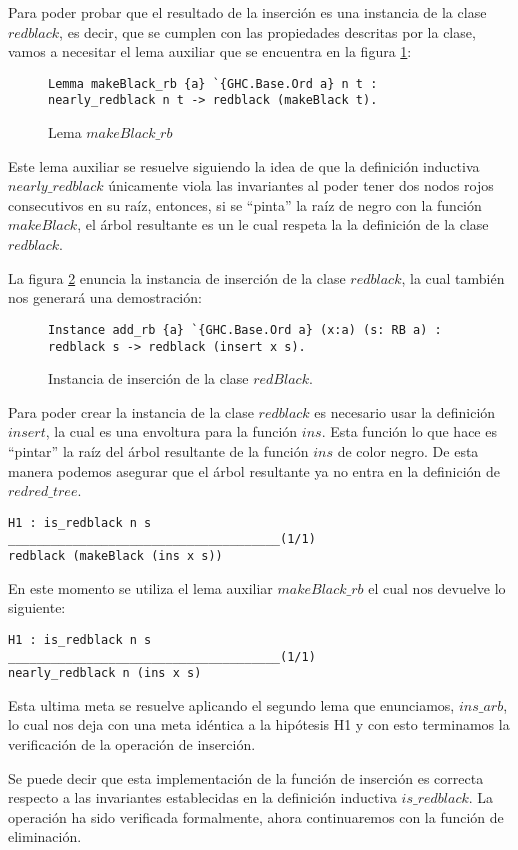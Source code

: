Para poder probar que el resultado de la inserci\'on es una instancia de la clase $redblack$, es 
decir, que se cumplen con las propiedades descritas por la clase, vamos a necesitar el lema auxiliar
que se encuentra en la figura \ref{lema_3}:
\begin{figure}[!ht]
\centering
\captionsetup{justification=centering}
\begin{verbatim}
Lemma makeBlack_rb {a} `{GHC.Base.Ord a} n t :
nearly_redblack n t -> redblack (makeBlack t).
\end{verbatim}
\caption{Lema $makeBlack\_rb$}
\label{lema_3}
\end{figure}

Este lema auxiliar se resuelve siguiendo la idea de que la definici\'on inductiva $nearly\_redblack$
únicamente viola las invariantes al poder tener dos nodos rojos consecutivos en su raíz, entonces, 
si se ``pinta'' la raíz de negro con la función $makeBlack$, el \'arbol resultante es un {\arn} le 
cual respeta la la definición de la clase $redblack$.

La figura \ref{instance_ins} enuncia la instancia de inserci\'on de la clase $redblack$, la cual 
también nos generar\'a una demostraci\'on:

\begin{figure}[!ht]
\centering
\captionsetup{justification=centering}
\begin{verbatim}
Instance add_rb {a} `{GHC.Base.Ord a} (x:a) (s: RB a) :
redblack s -> redblack (insert x s).
\end{verbatim}
\caption{Instancia de inserci\'on de la clase $redBlack$.}
\label{instance_ins}
\end{figure}

Para poder crear la instancia de la clase $redblack$ es necesario usar la definici\'on $insert$,
la cual es una envoltura para la funci\'on $ins$. Esta funci\'on lo que hace es ``pintar'' la
ra\'iz del \'arbol resultante de la funci\'on $ins$ de color negro. De esta manera podemos
asegurar que el \'arbol resultante ya no entra en la definici\'on de $redred\_tree$.

\begin{verbatim}
H1 : is_redblack n s
______________________________________(1/1)
redblack (makeBlack (ins x s))
\end{verbatim}

En este momento se utiliza el lema auxiliar $makeBlack\_rb$ el cual nos devuelve lo siguiente:

\begin{verbatim}
H1 : is_redblack n s
______________________________________(1/1)
nearly_redblack n (ins x s)
\end{verbatim}

Esta ultima meta se resuelve aplicando el segundo lema que enunciamos, $ins\_arb$, lo cual nos deja
con una meta idéntica a la hipótesis H1 y con esto terminamos la verificaci\'on de la operaci\'on
de inserci\'on.

Se puede decir que esta implementaci\'on de la funci\'on de inserci\'on es correcta respecto a las 
invariantes establecidas en la definici\'on inductiva $is\_redblack$. La operaci\'on  ha sido 
verificada formalmente, ahora continuaremos con la funci\'on de eliminaci\'on.
